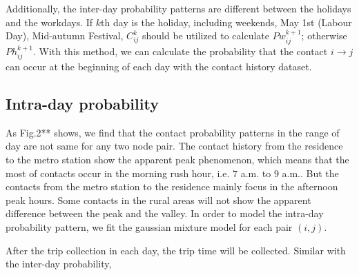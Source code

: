 Additionally, the inter-day probability patterns are different between the holidays and the workdays.
If $k$th day is the holiday, including weekends, May 1st (Labour Day), Mid-autumn Festival,  
$C^{k}_{i j}$ should be utilized to calculate $Pw^{k+1}_{i j}$;
otherwise $Ph^{k+1}_{i j}$.
With this method, we can calculate the probability that the contact $i \rightarrow j$ can occur 
at the beginning of each day with the contact history dataset.

\subsection{Intra-day probability}
As Fig.2** shows,
we find that the contact probability patterns in the range of day
are not same for any two node pair.
The contact history from the residence to the metro station 
show the apparent peak phenomenon,
which means that the most of contacts occur in the morning rush hour, i.e. $7$ a.m. to $9$ a.m..
But the contacts from the metro station to the residence
mainly focus in the afternoon peak hours.
Some contacts in the rural areas will not show the apparent difference between the peak and the valley.
In order to model the intra-day probability pattern,
we fit the gaussian mixture model for each pair $(i, j)$.

After the trip collection in each day, the trip time will be collected.
Similar with the inter-day probability,
